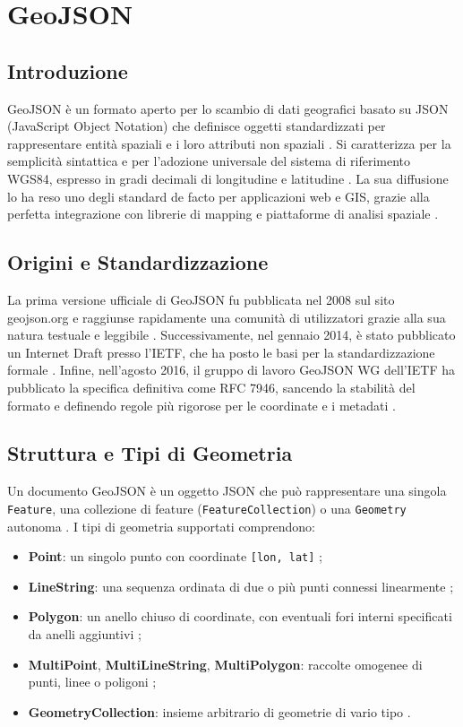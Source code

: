 \chapter{GeoJSON}

\section{Introduzione}
GeoJSON è un formato aperto per lo scambio di dati geografici basato su JSON (JavaScript Object Notation) che definisce oggetti standardizzati per rappresentare entità spaziali e i loro attributi non spaziali \cite{rfc7946}. Si caratterizza per la semplicità sintattica e per l'adozione universale del sistema di riferimento WGS84, espresso in gradi decimali di longitudine e latitudine \cite{rfc7946}. La sua diffusione lo ha reso uno degli standard de facto per applicazioni web e GIS, grazie alla perfetta integrazione con librerie di mapping e piattaforme di analisi spaziale \cite{geojson-spec}.

\section{Origini e Standardizzazione}
La prima versione ufficiale di GeoJSON fu pubblicata nel 2008 sul sito geojson.org e raggiunse rapidamente una comunità di utilizzatori grazie alla sua natura testuale e leggibile \cite{geojson-first}. Successivamente, nel gennaio 2014, è stato pubblicato un Internet Draft presso l'IETF, che ha posto le basi per la standardizzazione formale \cite{geojson-first}. Infine, nell'agosto 2016, il gruppo di lavoro GeoJSON WG dell'IETF ha pubblicato la specifica definitiva come RFC 7946, sancendo la stabilità del formato e definendo regole più rigorose per le coordinate e i metadati \cite{rfc7946}.

\section{Struttura e Tipi di Geometria}
Un documento GeoJSON è un oggetto JSON che può rappresentare una singola \texttt{Feature}, una collezione di feature (\texttt{FeatureCollection}) o una \texttt{Geometry} autonoma \cite{geojson-spec}.  
I tipi di geometria supportati comprendono:
\begin{itemize}
  \item \textbf{Point}: un singolo punto con coordinate \texttt{[lon, lat]} \cite{geojson-wiki};
  \item \textbf{LineString}: una sequenza ordinata di due o più punti connessi linearmente \cite{geojson-wiki};
  \item \textbf{Polygon}: un anello chiuso di coordinate, con eventuali fori interni specificati da anelli aggiuntivi \cite{geojson-wiki};
  \item \textbf{MultiPoint}, \textbf{MultiLineString}, \textbf{MultiPolygon}: raccolte omogenee di punti, linee o poligoni \cite{geojson-wiki};
  \item \textbf{GeometryCollection}: insieme arbitrario di geometrie di vario tipo \cite{geojson-spec}.
\end{itemize}

